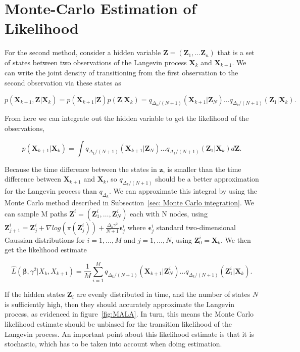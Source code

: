 \section{Monte-Carlo Estimation of Likelihood}
\label{sec: Monte Carlo Estimation}
For the second method, consider a hidden variable $\textbf{Z} = (\textbf{Z}_1, \dots \textbf{Z}_n)$ that is a set of states between two observations of the Langevin process $\textbf{X}_k$ and $\textbf{X}_{k+1}$. We can write the joint density of transitioning from the first observation to the second observation via these states as 

$$p(\textbf{X}_{k+1}, \textbf{Z} | \textbf{X}_k) = p(\textbf{X}_{k+1}|\textbf{Z})p(\textbf{Z}|\textbf{X}_k) = q_{\Delta_k/(N+1)}(\textbf{X}_{k+1}|\textbf{Z}_N)\dots q_{\Delta_k/(N+1)}(\textbf{Z}_1|\textbf{X}_k).
$$ 

From here we can integrate out the hidden variable to get the likelihood of the observations, 


$$p(\textbf{X}_{k+1}|\textbf{X}_k) = \int q_{\Delta_k/(N+1)}(\textbf{X}_{k+1}|\textbf{Z}_N)\dots q_{\Delta_k/(N+1)}(\textbf{Z}_1|\textbf{X}_k)d\textbf{Z}.
$$

Because the time difference between the states in $\textbf{z}$, is smaller than the time difference between $\textbf{X}_{k+1}$ and $\textbf{X}_k$, so $q_{\Delta_k/(N+1)}$ should be a better approximation for the Langevin process than $q_{\Delta_k}$. We can approximate this integral by using the Monte Carlo method described in Subsection~\ref{sec: Monte Carlo integration}. We can sample M paths $\textbf{Z}^i = (\textbf{Z}_1^i, \dots,\textbf{Z}_N^i)$ each with N nodes, using $\textbf{Z}_{j+1}^i = \textbf{Z}_j^i + \nabla log(\pi(\textbf{Z}_j^i)) + \frac{\Delta_k\gamma^2}{N+1}\bm \epsilon_j^i$ where $\bm \epsilon_j^i$ standard two-dimensional Gaussian distributions for $i=1, \dots , M$ and $j = 1,\dots , N$, using $\textbf{Z}_0^i = \textbf{X}_k$. We then get the likelihood estimate

$$
\hat{L}(\bm \beta , \gamma^2|X_k, X_{k+1}) =  \frac{1}{M}\sum_{i=1}^M q_{\Delta_k/(N+1)}(\textbf{X}_{k+1}|\textbf{Z}^i_N)\dots q_{\Delta_k/(N+1)}(\textbf{Z}^i_1|\textbf{X}_k).
\label{eq: montecarlo likelihood}
$$

If the hidden states $\textbf{Z}_i$ are evenly distributed in time, and the number of states $N$ is sufficiently high, then they should accurately approximate the Langevin process, as evidenced in figure~\ref{fig:MALA}. In turn, this means the Monte Carlo likelihood estimate should be unbiased for the transition likelihood of the Langevin process. An important point about this likelihood estimate is that it is stochastic, which has to be taken into account when doing estimation. 

